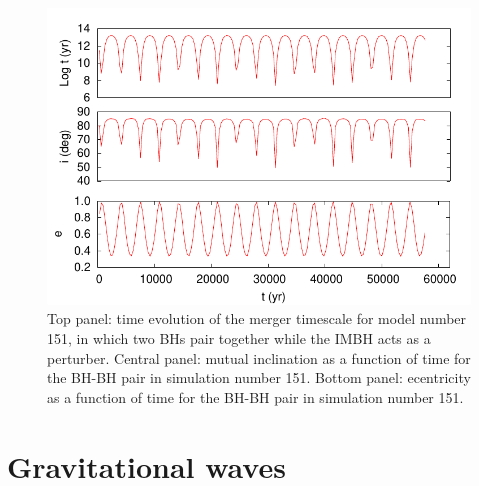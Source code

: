 \documentclass[twocolumn]{aastex62}
\begin{document}
\begin{figure}
\centering 
\includegraphics[width=\columnwidth]{kozai_151}
\caption{Top panel: time evolution of the merger timescale for model number 151, in which two BHs pair together while the IMBH acts as a perturber. Central panel: mutual inclination as a function of time for the BH-BH pair in simulation number 151. Bottom panel: ecentricity as a function of time for the BH-BH pair in simulation number 151.}
\label{F9}
\end{figure}


\section{Gravitational waves}
\end{document}
